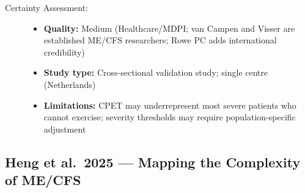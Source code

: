 \begin{description}
    \item[Certainty Assessment:]
    \begin{itemize}
        \item \textbf{Quality:} Medium (Healthcare/MDPI; van Campen and Visser are established ME/CFS researchers; Rowe PC adds international credibility)
        \item \textbf{Study type:} Cross-sectional validation study; single centre (Netherlands)
        \item \textbf{Limitations:} CPET may underrepresent most severe patients who cannot exercise; severity thresholds may require population-specific adjustment
    \end{itemize}
\end{description}

\subsection{Heng et al.\ 2025 --- Mapping the Complexity of ME/CFS}

